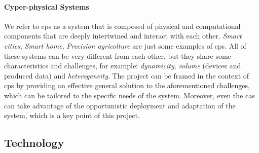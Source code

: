 \documentclass[12pt]{article}
\begin{document}
\paragraph{Cyper-physical Systems}
We refer to \ac{cps} as a system that is composed of physical and computational components
that are deeply intertwined and interact with each other.
%
\emph{Smart cities}, \emph{Smart home}, \emph{Precision agricolture} are just some examples of \ac{cps}.
%
All of these systems can be very different from each other,
but they share some characteristics and challenges,
for example: \emph{dynamicity}, \emph{volume} (devices and produced data) and \emph{heterogeneity}.
%
The project can be framed in the context of \ac{cps} by providing an effective general solution to the aforementioned challenges,
which can be tailored to the specific needs of the system.
%
Moreover,
even the \ac{cas} can take advantage of the opportunistic deployment and adaptation of the system,
which is a key point of this project.

\subsection{Technology}\label{subsec:technology}
\end{document}

